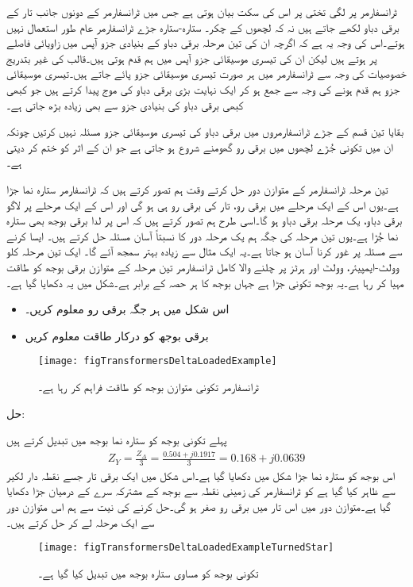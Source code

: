 	ٹرانسفارمر پر لگی تختی پر اس کی سکت بیان ہوتی ہے جس میں ٹرانسفارمر کے دونوں جانب تار کے برقی دباو لکھے جاتے ہیں نہ کہ لچھوں کے چکر۔
%
ستارہ-ستارہ جڑے ٹرانسفارمر عام طور استعمال نہیں ہوتے۔اس کی وجہ یہ ہے کہ اگرچہ ان کی تین مرحلہ برقی دباو  کے بنیادی جزو آپس میں   زاویائی فاصلے پر ہوتے ہیں لیکن ان کی تیسری موسیقائی جزو آپس میں ہم قدم ہوتی ہیں۔قالب کی غیر بتدریج خصوصیات کی وجہ سے ٹرانسفارمر میں ہر صورت تیسری موسیقائی جزو پائے جاتے ہیں۔تیسری موسیقائی جزو ہم قدم ہونے کی وجہ سے جمع ہو کر ایک نہایت بڑی برقی دباو کی موج پیدا کرتے ہیں جو کبھی کبھی برقی دباو کی بنیادی جزو سے بھی زیادہ بڑھ جاتی ہے۔

بقایا تین قسم کے جڑے ٹرانسفارمروں میں برقی دباو کی تیسری موسیقائی جزو مسئلہ نہیں کرتیں چونکہ ان میں تکونی جُڑے لچھوں میں برقی رو گھومنے شروع ہو جاتی ہے جو ان کے اثر کو ختم کر دیتی ہے۔

تین مرحلہ ٹرانسفارمر کے متوازن دور حل کرتے وقت ہم تصور کرتے ہیں کہ ٹرانسفارمر ستارہ نما جڑا  ہے۔یوں اس کے ایک مرحلے میں برقی رو، تار  کی برقی رو ہی ہو گی اور اس کے ایک مرحلے پر لاگو برقی دباو، یک مرحلہ برقی دباو  ہو گا۔اسی طرح ہم تصور کرتے ہیں کہ اس پر لدا برقی بوجھ بھی ستارہ نما جُڑا ہے۔یوں تین مرحلہ کی جگہ ہم یک مرحلہ دور کا نسبتاً آسان مسئلہ حل کرتے ہیں۔ ایسا کرنے سے مسئلہ پر غور کرنا آسان ہو جاتا ہے۔یہ ایک مثال سے زیادہ بہتر سمجھ آئے گا۔
%
ایک تین مرحلہ     کلو وولٹ-ایمپیئر،    وولٹ اور  ہرٹز پر چلنے والا کامل ٹرانسفارمر تین مرحلہ کے متوازن برقی بوجھ کو طاقت مہیا کر رہا ہے۔یہ بوجھ تکونی جڑا ہے جہاں بوجھ کا ہر حصہ  کے برابر ہے۔شکل   میں یہ دکھایا گیا ہے۔
\begin{itemize}
\item
اس شکل میں ہر جگہ برقی رو معلوم کریں۔
\item
برقی بوجھ کو درکار طاقت معلوم کریں
\end{itemize}

\begin{figure}
\centering
\texttt{[image: figTransformersDeltaLoadedExample]}
\caption{ٹرانسفارمر تکونی متوازن بوجھ کو طاقت فراہم کر رہا ہے۔}
\label{شکل_ٹرانسفارمر_تکونی_بار_کی_مثال}
\end{figure}
حل:

پہلے تکونی بوجھ کو ستارہ نما بوجھ میں تبدیل کرتے ہیں
\begin{align*}
Z_Y= \frac{Z_\Delta}{3}=\frac{0.504+j0.1917}{3}=0.168+j0.0639
\end{align*}
اس بوجھ کو ستارہ نما جڑا شکل  میں دکھایا گیا ہے۔اس شکل میں ایک برقی تار جسے نقطہ دار لکیر سے ظاہر کیا گیا ہے کو ٹرانسفارمر کی زمینی نقطہ سے بوجھ کے مشترکہ سرے کے درمیان جڑا دکھایا گیا ہے۔متوازن دور میں اس تار میں برقی رو صفر ہو گی۔حل کرنے کی نیت سے ہم اس متوازن دور سے ایک مرحلہ لے کر حل کرتے ہیں۔
\begin{figure}
\centering
\texttt{[image: figTransformersDeltaLoadedExampleTurnedStar]}
\caption{تکونی بوجھ کو مساوی ستارہ بوجھ میں تبدیل کیا گیا ہے۔}
\label{شکل_ٹرانسفارمر_تکونی_بار_کو_ستارہ_تبادلہ}
\end{figure}


